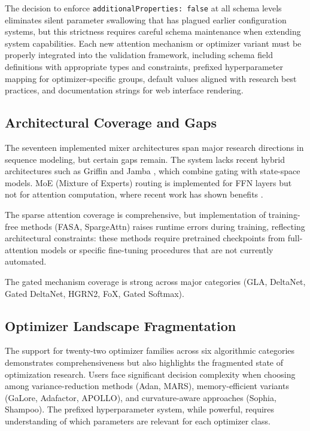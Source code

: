 \documentclass[11pt,a4paper]{article}
\begin{document}
The decision to enforce \texttt{additionalProperties: false} at all schema levels eliminates silent parameter swallowing that has plagued earlier configuration systems, but this strictness requires careful schema maintenance when extending system capabilities. Each new attention mechanism or optimizer variant must be properly integrated into the validation framework, including schema field definitions with appropriate types and constraints, prefixed hyperparameter mapping for optimizer-specific groups, default values aligned with research best practices, and documentation strings for web interface rendering.

\subsection{Architectural Coverage and Gaps}

The seventeen implemented mixer architectures span major research directions in sequence modeling, but certain gaps remain. The system lacks recent hybrid architectures such as Griffin \citep{soares_griffin_2024} and Jamba \citep{gu_jamba_2024}, which combine gating with state-space models. MoE (Mixture of Experts) routing is implemented for FFN layers but not for attention computation, where recent work has shown benefits \citep{lewis_moe_2021}.

The sparse attention coverage is comprehensive, but implementation of training-free methods (FASA, SpargeAttn) raises runtime errors during training, reflecting architectural constraints: these methods require pretrained checkpoints from full-attention models or specific fine-tuning procedures that are not currently automated.

The gated mechanism coverage is strong across major categories (GLA, DeltaNet, Gated DeltaNet, HGRN2, FoX, Gated Softmax).

\subsection{Optimizer Landscape Fragmentation}

The support for twenty-two optimizer families across six algorithmic categories demonstrates comprehensiveness but also highlights the fragmented state of optimization research. Users face significant decision complexity when choosing among variance-reduction methods (Adan, MARS), memory-efficient variants (GaLore, Adafactor, APOLLO), and curvature-aware approaches (Sophia, Shampoo). The prefixed hyperparameter system, while powerful, requires understanding of which parameters are relevant for each optimizer class.
\end{document}
